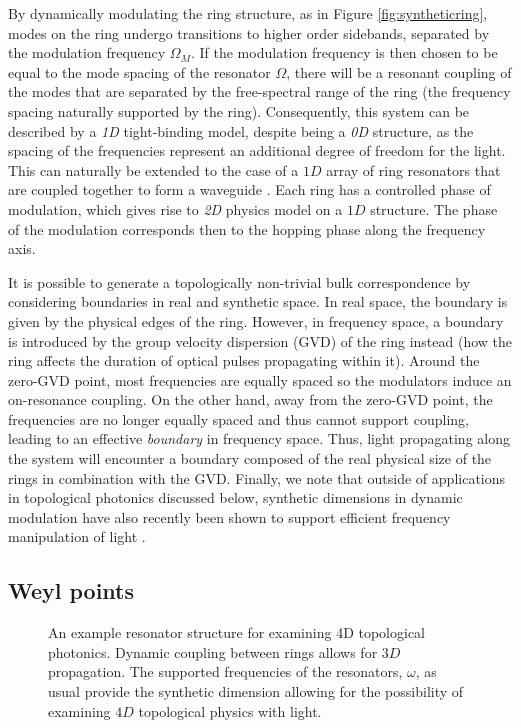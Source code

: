 By dynamically modulating the ring structure, as in Figure \ref{fig:syntheticring}, modes on the ring undergo transitions to higher order sidebands, separated by the modulation frequency $\Omega_M$. If the modulation frequency is then chosen to be equal to the mode spacing of the resonator $\Omega$, there will be a resonant coupling of the modes that are separated by the free-spectral range of the ring (the frequency spacing naturally supported by the ring). Consequently, this system can be described by a \textit{1D} tight-binding model, despite being a \textit{0D} structure, as the spacing of the frequencies represent an additional degree of freedom for the light. This can naturally be extended to the case of a $1D$ array of ring resonators that are coupled together to form a waveguide \cite{Yuan2016c}. Each ring has a controlled phase of modulation, which gives rise to \textit{2D} physics model on a $1D$ structure. The phase of the modulation corresponds then to the hopping phase along the frequency axis.

It is possible to generate a topologically non-trivial bulk correspondence by considering boundaries in real and synthetic space. In real space, the boundary is given by the physical edges of the ring. However, in frequency space, a boundary is introduced by the group velocity dispersion (GVD) of the ring instead (how the ring affects the duration of optical pulses propagating within it). Around the zero-GVD point, most frequencies are equally spaced so the modulators induce an on-resonance coupling. On the other hand, away from the zero-GVD point, the frequencies are no longer equally spaced and thus cannot support coupling, leading to an effective \textit{boundary} in frequency space. Thus, light propagating along the system will encounter a boundary composed of the real physical size of the rings in combination with the GVD. Finally, we note that outside of applications in topological photonics discussed below, synthetic dimensions in dynamic modulation have also recently been shown to support efficient frequency manipulation of light \cite{Qin2017}.

\subsection{Weyl points}

\begin{figure}[t]
\centering
\def\svgwidth{0.8\textwidth}
\begin{normalsize}

\end{normalsize}
\caption[A $3D$ synthetic resonator lattice]{An example resonator structure for examining 4D topological photonics. Dynamic coupling between rings allows for $3D$ propagation. The supported frequencies of the resonators, $\omega$, as usual provide the synthetic dimension allowing for the possibility of examining $4D$ topological physics with light.}
\label{fig:synthetic3d}
\end{figure}

